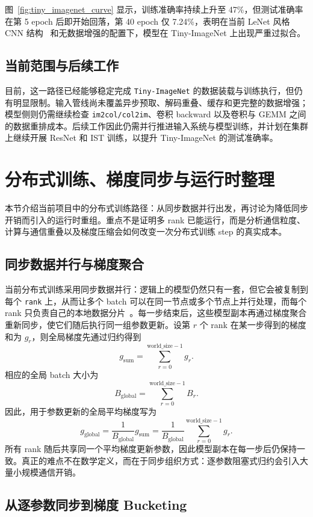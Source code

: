 \documentclass[a4paper,11pt,oneside]{article}
\begin{document}
图~\ref{fig:tiny_imagenet_curve} 显示，训练准确率持续上升至 47\%，但测试准确率在第 5 epoch 后即开始回落，第 40 epoch 仅 7.24\%，表明在当前 LeNet 风格 CNN 结构~\cite{lecun1998} 和无数据增强的配置下，模型在 Tiny-ImageNet 上出现严重过拟合。

\clearpage
\subsection{当前范围与后续工作}

目前，这一路径已经能够稳定完成 \texttt{Tiny-ImageNet} 的数据装载与训练执行，但仍有明显限制。输入管线尚未覆盖异步预取、解码重叠、缓存和更完整的数据增强；模型侧则仍需继续检查 \texttt{im2col/col2im}、卷积 backward 以及卷积与 GEMM 之间的数据重排成本。后续工作因此仍需并行推进输入系统与模型训练，并计划在集群上继续开展 ResNet 和 IST 训练，以提升 Tiny-ImageNet 的测试准确率。

\section{分布式训练、梯度同步与运行时整理}

本节介绍当前项目中的分布式训练路径：从同步数据并行出发，再讨论为降低同步开销而引入的运行时重组。重点不是证明多 rank 已能运行，而是分析通信粒度、计算与通信重叠以及梯度压缩会如何改变一次分布式训练 step 的真实成本。

\subsection{同步数据并行与梯度聚合}

当前分布式训练采用同步数据并行：逻辑上的模型仍然只有一套，但它会被复制到每个 \texttt{rank} 上，从而让多个 batch 可以在同一节点或多个节点上并行处理，而每个 rank 只负责自己的本地数据分片~\cite{sergeev2018horovod}。每一步结束后，这些模型副本再通过梯度聚合重新同步，使它们随后执行同一组参数更新。设第 $r$ 个 rank 在某一步得到的梯度和为 $g_r$，则全局梯度先通过归约得到
\[
g_{\mathrm{sum}}=\sum_{r=0}^{\mathrm{world\_size}-1} g_r.
\]
相应的全局 batch 大小为
\[
B_{\mathrm{global}}=\sum_{r=0}^{\mathrm{world\_size}-1} B_r.
\]
因此，用于参数更新的全局平均梯度写为
\[
g_{\mathrm{global}}
=\frac{1}{B_{\mathrm{global}}}g_{\mathrm{sum}}
=\frac{1}{B_{\mathrm{global}}}\sum_{r=0}^{\mathrm{world\_size}-1} g_r.
\]
所有 rank 随后共享同一个平均梯度更新参数，因此模型副本在每一步后仍保持一致。真正的难点不在数学定义，而在于同步组织方式：逐参数阻塞式归约会引入大量小规模通信开销。

\subsection{从逐参数同步到梯度 Bucketing}
\end{document}
